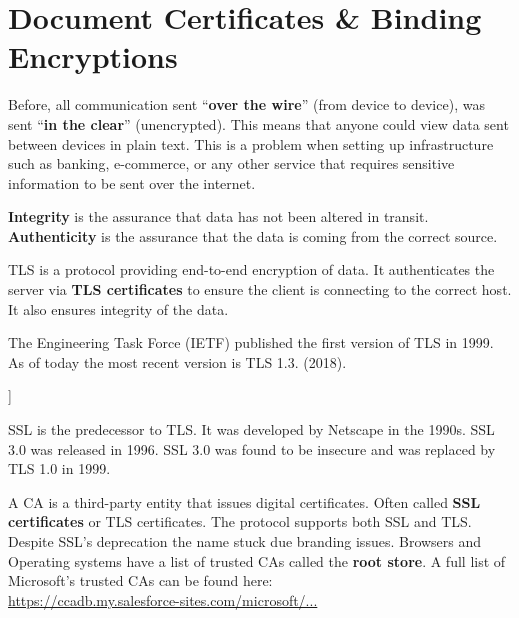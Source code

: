 \section{Document Certificates \& Binding Encryptions}
Before, all communication sent ``\textbf{over the wire}'' (from device to device),
was sent ``\textbf{in the clear}'' (unencrypted). This means that anyone could 
view data sent between devices in plain text. This is a problem when setting up 
infrastructure such as banking, e-commerce, or any other service that requires
sensitive information to be sent over the internet.

\label{sec:tls}
\begin{Def}

    \textbf{Integrity} is the assurance that data has not been altered in transit.\\
    \textbf{Authenticity} is the assurance that the data is coming from the correct source.
\end{Def}
\begin{Def}

    TLS is a protocol providing end-to-end encryption of data. It authenticates
    the server via \textbf{TLS certificates} to ensure the client is connecting to 
    the correct host. It also ensures integrity of the data.

    The Engineering Task Force (IETF) published the first version of TLS in 1999. As of 
    today the most recent version is TLS 1.3. (2018).
    \hfill \cite{cloudflare_tls}
\end{Def}

\begin{Def}[Secure Sockets Layer (SSL) [Deprecated]]

    SSL is the predecessor to TLS. It was developed by Netscape in the 1990s. 
    SSL 3.0 was released in 1996. SSL 3.0 was found to be insecure and was replaced
    by TLS 1.0 in 1999.
    \hfill \cite{cloudflare_tls}
\end{Def}

\begin{Def}

    A CA is a third-party entity that issues digital certificates. Often called \textbf{SSL certificates} or TLS certificates.
    The protocol supports both SSL and TLS. Despite SSL's deprecation the name stuck due branding issues.
    Browsers and Operating systems have a list of trusted CAs called the \textbf{root store}.
    A full list of Microsoft's trusted CAs can be found here:\\ \href{https://ccadb.my.salesforce-sites.com/microsoft/IncludedCACertificateReportForMSFT}{https://ccadb.my.salesforce-sites.com/microsoft/...}
    \hfill \cite{kinsta_tls_ssl}
\end{Def}

